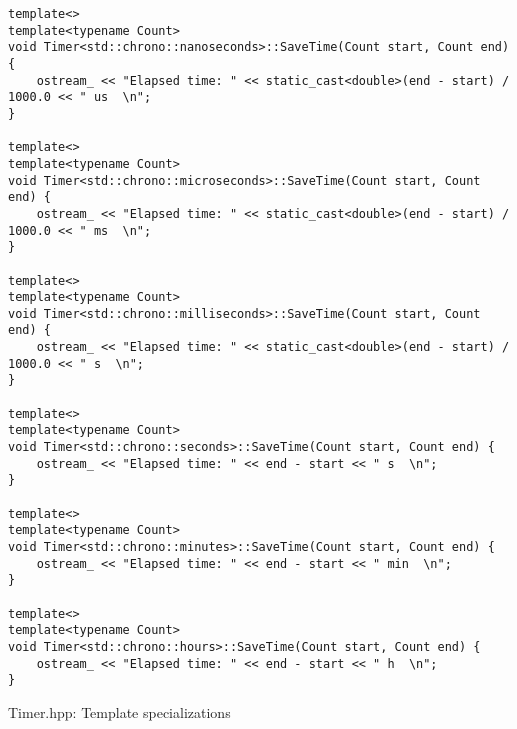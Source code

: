 \begin{listing}[!htb]
\begin{verbatim}
template<>
template<typename Count>
void Timer<std::chrono::nanoseconds>::SaveTime(Count start, Count end) {
    ostream_ << "Elapsed time: " << static_cast<double>(end - start) / 1000.0 << " us  \n";
}

template<>
template<typename Count>
void Timer<std::chrono::microseconds>::SaveTime(Count start, Count end) {
    ostream_ << "Elapsed time: " << static_cast<double>(end - start) / 1000.0 << " ms  \n";
}

template<>
template<typename Count>
void Timer<std::chrono::milliseconds>::SaveTime(Count start, Count end) {
    ostream_ << "Elapsed time: " << static_cast<double>(end - start) / 1000.0 << " s  \n";
}

template<>
template<typename Count>
void Timer<std::chrono::seconds>::SaveTime(Count start, Count end) {
    ostream_ << "Elapsed time: " << end - start << " s  \n";
}

template<>
template<typename Count>
void Timer<std::chrono::minutes>::SaveTime(Count start, Count end) {
    ostream_ << "Elapsed time: " << end - start << " min  \n";
}

template<>
template<typename Count>
void Timer<std::chrono::hours>::SaveTime(Count start, Count end) {
    ostream_ << "Elapsed time: " << end - start << " h  \n";
}
\end{verbatim}
\caption{Timer.hpp: Template specializations}
\label{lst:timer_specializations}
\end{listing}

